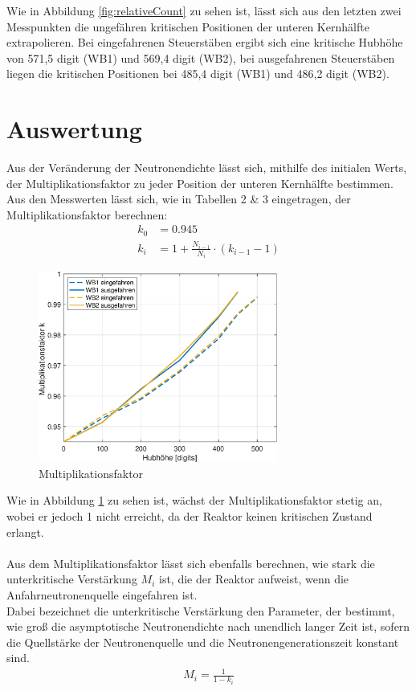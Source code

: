 \documentclass[12pt,german]{article}
\begin{document}
    Wie in Abbildung \ref{fig:relativeCount} zu sehen ist, lässt sich aus den letzten zwei Messpunkten die ungefähren kritischen Positionen der unteren Kernhälfte extrapolieren.
    Bei eingefahrenen Steuerstäben ergibt sich eine kritische Hubhöhe von 571,5 digit (WB1) und 569,4 digit (WB2), bei ausgefahrenen Steuerstäben liegen die kritischen Positionen bei 485,4 digit (WB1) und 486,2 digit (WB2).

    \section{Auswertung}


    Aus der Veränderung der Neutronendichte lässt sich, mithilfe des initialen Werts, der Multiplikationsfaktor zu jeder Position der unteren Kernhälfte bestimmen. \\
    Aus den Messwerten lässt sich, wie in Tabellen 2 \& 3 eingetragen, der Multiplikationsfaktor berechnen:
    \begin{align*}
        k_0 &= 0.945 \\
        k_i &= 1 + \frac{N_{i-1}}{N_i} \cdot \left(k_{i-1} - 1\right)
    \end{align*}
    
    \begin{figure}[H]
        \centering
        \includegraphics[width=0.7\textwidth]{multiplikationsfaktor.eps}
        \caption{Multiplikationsfaktor}
        \label{fig:multFaktor}
    \end{figure}
    Wie in Abbildung \ref{fig:multFaktor} zu sehen ist, wächst der Multiplikationsfaktor stetig an, wobei er jedoch 1 nicht erreicht, da der Reaktor keinen kritischen Zustand erlangt.
    \\ \\
    Aus dem Multiplikationsfaktor lässt sich ebenfalls berechnen, wie stark die unterkritische Verstärkung $M_i$ ist, die der Reaktor aufweist, wenn die Anfahrneutronenquelle eingefahren ist. \\
    Dabei bezeichnet die unterkritische Verstärkung den Parameter, der bestimmt, wie groß die asymptotische Neutronendichte nach unendlich langer Zeit ist, sofern die Quellstärke der Neutronenquelle und die Neutronengenerationszeit konstant sind.
    \begin{align*}
        M_i = \frac{1}{1 - k_i}
    \end{align*}
\end{document}
